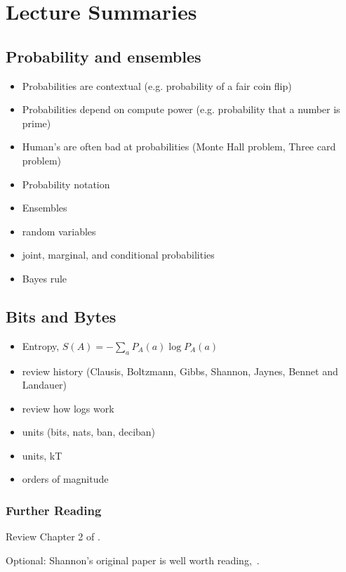 \documentclass[Lectures.tex]{subfiles}
\begin{document}
\section{Lecture Summaries}

\subsection{Probability and ensembles}
\begin{itemize}
\item Probabilities are contextual (e.g. probability of a fair coin flip)
\item Probabilities depend on compute power (e.g. probability that a number is prime) 
\item Human's are often bad at probabilities (Monte Hall problem, Three card problem)
\item Probability notation
\item Ensembles
\item random variables
\item joint, marginal, and conditional probabilities
\item Bayes rule
\end{itemize}

\subsection{Bits and Bytes}
\begin{itemize}
\item Entropy, $S(A) = -\sum_a P_A(a) \log P_A(a)$
\item review history (Clausis, Boltzmann, Gibbs, Shannon, Jaynes, Bennet and Landauer)
\item review how logs work
\item units (bits, nats, ban, deciban)
\item units, kT
\item orders of magnitude
\end{itemize}

\subsubsection*{Further Reading}
Review Chapter 2 of .

\noindent
Optional: Shannon's original paper is well worth reading,~.

 
\end{document}

